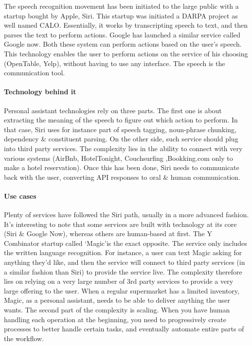 \documentclass[12pt]{article}
\begin{document}
The speech recognition movement has been initiated to the large public with a
startup bought by Apple, Siri. This startup was initiated a DARPA project as
well named CALO. Essentially, it works by transcripting speech to text, and then
parses the text to perform actions. Google has launched a similar service called
Google now. Both these system can perform actions based on the user's speech.
This technology enables the user to perform actions on the service of his
choosing (OpenTable, Yelp), without having to use any interface. The speech is
the communication tool.
\\

\paragraph{Technology behind it}
Personal assistant technologies rely on three parts.
The first one is about extracting the meaning of the speech to figure out which
action to perform. In that case, Siri uses for instance part of speech tagging,
noun-phrase chunking, dependency \& constituent parsing. On the other side,
such service should plug into third party services. The complexity lies in the
ability to connect with very various systems (AirBnb, HotelTonight, Couchsurfing
,Bookking.com only to make a hotel reservation). Once this has been done, Siri
needs to communicate back with the user, converting API responses to oral \&
human communication.

\paragraph{Use cases}

Plenty of services have followed the Siri path, usually in a more advanced
fashion. It's interesting to note that some services are built with technology
at its core (Siri \& Google Now), whereas others are human-based at first. The Y
Combinator startup called \lq Magic\rq  is the exact opposite. The service only
includes the written language recognition. For instance, a user can text Magic
asking for anything they'd like, and then the service will connect to third
party services (in a similar fashion than Siri) to provide the service live. The
complexity therefore lies on relying on a very large number of 3rd party
services to provide a very large offering to the user. When a regular supermarket
has a limited inventory, Magic, as a personal assistant, needs to be able to
deliver anything the user wants. The second part of the complexity is scaling.
When you have human handling each operation at the beginning, you need to
progressively create processes to better handle certain tasks, and eventually
automate entire parts of the workflow.
\end{document}
